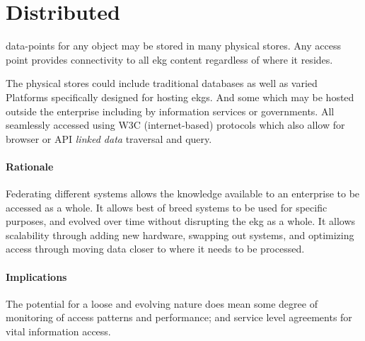 \section{Distributed}\label{sec:ekg-principle-distributed}

\Glspl{data-point} for any object may be stored in many physical stores. 
Any access point provides connectivity to all \gls{ekg} content regardless of where it resides.

The physical stores could include traditional databases as well as varied 
Platforms specifically designed for hosting \glspl{ekg}. 
And some which may be hosted outside the enterprise including by information services or governments. 
All seamlessly accessed using W3C (internet-based) protocols which also allow for browser or 
API \textit{linked data} traversal and query.

\paragraph{Rationale}

Federating different systems allows the knowledge available to an enterprise to be accessed as a whole.
It allows best of breed systems to be used for specific purposes, 
and evolved over time without disrupting the \gls{ekg} as a whole.
It allows scalability through adding new hardware, swapping out systems, 
and optimizing access through moving data closer to where it needs to be processed.

\paragraph{Implications} 

The potential for a loose and evolving nature does mean some degree of monitoring of 
access patterns and performance; and service level agreements for vital information access.
